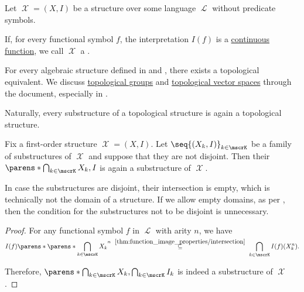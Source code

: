 \begin{remark}\label{rem:topological_first_order_structures}
  Let \( \mscrX = (X, I) \) be a structure over some language \( \mscrL \) without predicate symbols.

  If, for every functional symbol \( f \), the interpretation \( I(f) \) is a \hyperref[def:global_continuity]{continuous function}, we call \( \mscrX \) a .

  For every algebraic structure defined in  and , there exists a topological equivalent. We discuss \hyperref[def:topological_group]{topological groups} and \hyperref[def:topological_vector_space]{topological vector spaces} through the document, especially in .

  Naturally, every substructure of a topological structure is again a topological structure.
\end{remark}

\begin{proposition}\label{thm:intersection_substructure}
  Fix a first-order structure \( \mscrX = (X, I) \). Let \( \seq{ (X_k, I) }_{k \in \mscrK} \) be a family of substructures of \( \mscrX \) and suppose that they are not disjoint. Then their  \( \parens*{\bigcap_{k \in \mscrK} X_k, I} \) is again a substructure of \( \mscrX \).
\end{proposition}
\begin{comments}
  \item In case the substructures are disjoint, their intersection is empty, which is technically not the domain of a structure. If we allow empty domains, as per , then the condition for the substructures not to be disjoint is unnecessary.
\end{comments}
\begin{proof}
  For any functional symbol \( f \) in \( \mscrL \) with arity \( n \), we have
  \begin{equation*}
    I(f)\parens*{\parens*{\bigcap_{\smash{k \in \mscrK}} X_k}^n}
    \reloset {\ref{thm:function_image_properties/intersection}} \subseteq
    \bigcap_{k \in \mscrK} I(f)(X_k^n).
  \end{equation*}

  Therefore, \( \parens*{\bigcap_{k \in \mscrK} X_k, \bigcap_{k \in \mscrK} I_k} \) is indeed a substructure of \( \mscrX \).
\end{proof}

